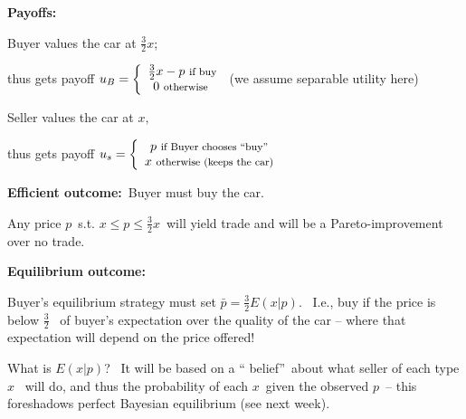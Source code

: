 \documentclass[handout]{beamer}
\begin{document}
\begin{frame}%

\textbf{Payoffs: }

Buyer values the car at $\frac{3}{2}x$;

thus gets payoff $u_{B}=\left\{ 
\begin{array}{c}
\frac{3}{2}x-p\text{ {\footnotesize if buy}} \\ 
0\text{ {\footnotesize otherwise }}%
\end{array}%
\right. $ {\footnotesize (we assume separable utility here) }

\medskip 
\pause%
Seller values the car at $x,$

thus gets payoff $u_{s}=\left\{ 
\begin{array}{c}
p\text{ {\footnotesize if Buyer chooses \textquotedblleft
buy\textquotedblright }} \\ 
x\text{ {\footnotesize otherwise (keeps the car)}}%
\end{array}%
\right. $\medskip

\medskip 
\pause%
\textbf{Efficient outcome:}\ Buyer must buy the car. \ 

{\footnotesize Any price }$p${\footnotesize \ s.t. }$x\leq p\leq \frac{3}{2}%
x ${\footnotesize \ will yield trade and will be a Pareto-improvement over
no trade.}

\end{frame}%

\begin{frame}%

\textbf{Equilibrium outcome:}

Buyer's equilibrium strategy must set $\bar{p}=\frac{3}{2}E(x|p)$. \ 
{\footnotesize I.e., buy if the price is below }$\frac{3}{2}${\footnotesize %
\ of buyer's expectation over the quality of the car -- where that
expectation will depend on the price offered!}\bigskip 
\pause%

What is $E(x|p)$? \ {\footnotesize It will be based on a \textquotedblleft
belief\textquotedblright\ about what seller of each type }$x${\footnotesize %
\ will do, and thus the probability of each }$x${\footnotesize \ given the
observed }$p${\footnotesize \ -- this foreshadows perfect Bayesian
equilibrium (see next week).} 

\end{frame}%
\end{document}
